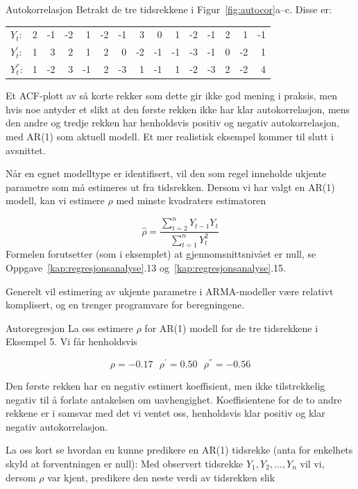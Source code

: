 \begin{eksempel}{Autokorrelasjon}
Betrakt de tre tidsrekkene i Figur~\ref{fig:autocor}a--c.  Disse er: 
\begin{center}
\begin{tabular}{lrrrrrrrrrrrrrr}
 $Y_t$:     & 2&-1&-2&  1&-2&-1&  3&  0&  1& -2&-1&  2&  1&-1 \\
 $Y^{'}_t$: & 1& 3& 2&  1& 2& 0& -2& -1& -1& -3&-1&  0& -2& 1 \\
 $Y^{''}_t$:& 1&-2& 3& -1& 2&-3&  1& -1&  1& -2&-3&  2& -2& 4
\end{tabular}
\end{center}
Et ACF-plott av så korte rekker som dette gir ikke god mening i praksis,
men hvis noe antyder et slikt at den første rekken ikke
har klar auto\-korrelasjon, mens den andre og tredje rekken har henholdsvis
positiv og negativ autokorrelasjon, med AR(1) som aktuell modell.
Et mer realistisk eksempel kommer til slutt i avsnittet.
\end{eksempel}


Når en egnet modelltype er identifisert, vil den som regel inneholde
ukjente parametre som må estimeres ut fra tidsrekken.
Dersom vi har valgt en AR(1) modell, kan vi estimere $\rho$ med
minste kvadraters estimatoren 

\[ \hat{\rho} = \frac{\sum_{t=2}^{n}Y_{t-1}Y_t}{\sum_{t=1}^{n}Y_t^2} \]
Formelen forutsetter (som i eksemplet) at gjennomsnittsnivået er null, se
Oppgave~\ref*{kap:regresjonsanalyse}.13 og~\ref*{kap:regresjonsanalyse}.15.

Generelt vil estimering av ukjente parametre i ARMA-modeller være relativt
komplisert, og en trenger programvare for beregningene.\\

\begin{eksempel}{Autoregresjon}
La oss estimere $\rho$ for AR(1) modell for de tre tidsrekkene i Eksempel 5.
Vi får henholdsvis

\[ \rho =-0.17 \mbox{\ \ \ }{\rho}^{'}=0.50 \mbox{\ \ \ }{\rho}^{''}=-0.56 \]

\noindent Den første rekken har en negativ estimert koeffisient, men ikke 
tilstrekkelig negativ til å forlate antakelsen om uavhengighet.  
Koeffisientene for de to andre rekkene er i samsvar med det vi ventet oss,
henholdsvis klar positiv og klar negativ autokorrelasjon.
\end{eksempel}

La oss kort se hvordan en kunne predikere en AR(1) tidsrekke (anta for
enkelhets skyld at forventningen er null):
Med observert tidsrekke $Y_1, Y_2, \ldots, Y_n$ vil vi,
dersom $\rho$ var kjent, predikere den neste verdi av tids\-rekken slik

